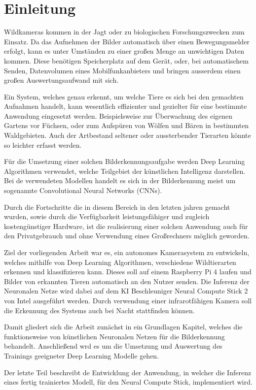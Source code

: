 \chapter{Einleitung}\label{kap:einleitung}

Wildkameras kommen in der Jagt oder zu biologischen 
Forschungszwecken zum Einsatz.
Da das Aufnehmen der Bilder automatisch über einen 
Bewegungsmelder erfolgt, kann es unter Umständen zu 
einer großen Menge an unwichtigen Daten kommen.
Diese benötigen Speicherplatz auf dem Gerät, 
oder, bei automatischem Senden, Datenvolumen eines 
Mobilfunkanbieters und bringen ausserdem einen 
großen Auswertungsaufwand mit sich.

Ein System, welches genau erkennt, um welche Tiere es
sich bei den gemachten Aufnahmen handelt, kann wesentlich 
effizienter und gezielter für eine bestimmte Anwendung 
eingesetzt werden.
Beispielsweise zur Überwachung des eigenen Gartens vor 
Füchsen, oder zum Aufspüren von Wölfen und Bären 
in bestimmten Waldgebieten.
Auch der Artbestand seltener oder aussterbender 
Tierarten könnte so leichter erfasst werden.

Für die Umsetzung einer solchen Bilderkennungsaufgabe 
werden Deep Learning Algorithmen verwendet, welche 
Teilgebiet der künstlichen Intelligenz darstellen.
Bei de verwendeten Modellen handelt es sich in der Bilderkennung
meist um sogenannte Convolutional Neural Networks (CNNs).


Durch die Fortschritte die in diesem Bereich in
den letzten jahren gemacht wurden, sowie durch 
die Verfügbarkeit leistungsfähiger und zugleich
kostengünstiger Hardware, ist die realisierung
einer solchen Anwendung auch für den Privatgebrauch
und ohne Verwendung eines Großrechners möglich geworden.


Ziel der vorliegenden Arbeit war es, ein autonomes Kamerasystem 
zu entwickeln, welches mithilfe von Deep Learning Algorithmen, 
verschiedene Wildtierarten erkennen und klassifizieren kann.
Dieses soll auf einem Raspberry Pi 4 laufen und 
Bilder von erkannten Tieren automatisch an den Nutzer 
senden.
Die Inferenz der Neuronalen Netze wird dabei
auf dem KI Beschleuniger Neural Compute Stick 2
von Intel ausgeführt werden. Durch verwendung einer 
infrarotfähigen Kamera soll die Erkennung des 
Systems auch bei Nacht stattfinden können.

Damit gliedert sich die Arbeit zunächst in ein
Grundlagen Kapitel, welches die funktionsweise 
von künstlichen Neuronalen Netzen für die
Bilderkennung behandelt.
Anschließend wrd es um die Umsetzung und Auswertung des 
Trainings geeigneter Deep Learning Modelle gehen.

Der letzte Teil beschreibt de Entwicklung der Anwendung, 
in welcher die Inferenz eines fertig trainiertes Modell, 
für den Neural Compute Stick, implementiert wird.